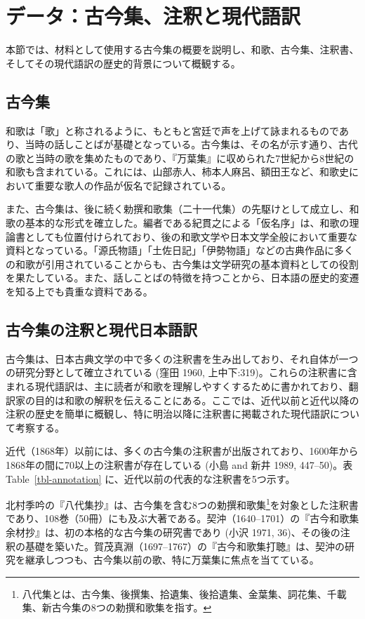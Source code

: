 \documentclass[
  letterpaper,
  DIV=11,
  numbers=noendperiod]{scrartcl}
\begin{document}
\section{データ：古今集、注釈と現代語訳}\label{sec-materials}

本節では、材料として使用する古今集の概要を説明し、和歌、古今集、注釈書、そしてその現代語訳の歴史的背景について概観する。

\subsection{古今集}\label{ux53e4ux4ecaux96c6}

和歌は「歌」と称されるように、もともと宮廷で声を上げて詠まれるものであり、当時の話しことばが基礎となっている。古今集は、その名が示す通り、古代の歌と当時の歌を集めたものであり、『万葉集』に収められた7世紀から8世紀の和歌も含まれている。これには、山部赤人、柿本人麻呂、額田王など、和歌史において重要な歌人の作品が仮名で記録されている。

また、古今集は、後に続く勅撰和歌集（二十一代集）の先駆けとして成立し、和歌の基本的な形式を確立した。編者である紀貫之による「仮名序」は、和歌の理論書としても位置付けられており、後の和歌文学や日本文学全般において重要な資料となっている。「源氏物語」「土佐日記」「伊勢物語」などの古典作品に多くの和歌が引用されていることからも、古今集は文学研究の基本資料としての役割を果たしている。また、話しことばの特徴を持つことから、日本語の歴史的変遷を知る上でも貴重な資料である。

\subsection{古今集の注釈と現代日本語訳}\label{ux53e4ux4ecaux96c6ux306eux6ce8ux91c8ux3068ux73feux4ee3ux65e5ux672cux8a9eux8a33}

古今集は、日本古典文学の中で多くの注釈書を生み出しており、それ自体が一つの研究分野として確立されている
(窪田 1960,
上中下:319)。これらの注釈書に含まれる現代語訳は、主に読者が和歌を理解しやすくするために書かれており、翻訳家の目的は和歌の解釈を伝えることにある。ここでは、近代以前と近代以降の注釈の歴史を簡単に概観し、特に明治以降に注釈書に掲載された現代語訳について考察する。

近代（1868年）以前には、多くの古今集の注釈書が出版されており、1600年から1868年の間に70以上の注釈書が存在している
(小島 and 新井 1989, 447--50)。表 Table~\ref{tbl-annotation}
に、近代以前の代表的な注釈書を5つ示す。

北村季吟の『八代集抄』は、古今集を含む8つの勅撰和歌集\footnote{八代集とは、古今集、後撰集、拾遺集、後拾遺集、金葉集、詞花集、千載集、新古今集の8つの勅撰和歌集を指す。}を対象とした注釈書であり、108巻（50冊）にも及ぶ大著である。契沖（1640--1701）の『古今和歌集余材抄』は、初の本格的な古今集の研究書であり
(小沢 1971,
36)、その後の注釈の基礎を築いた。賀茂真淵（1697--1767）の『古今和歌集打聴』は、契沖の研究を継承しつつも、古今集以前の歌、特に万葉集に焦点を当てている。
\end{document}
